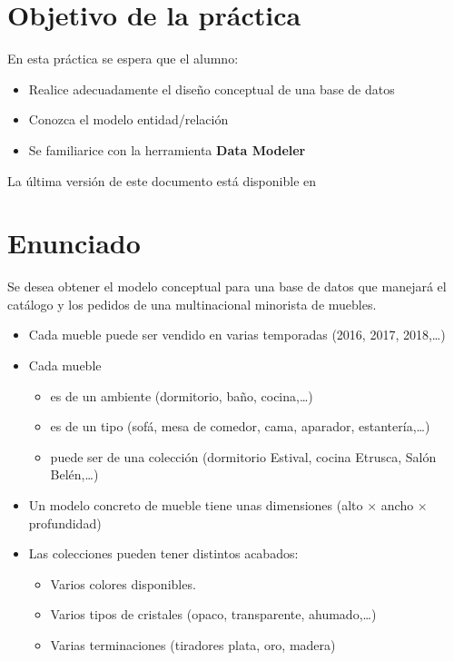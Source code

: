 

\renewcommand{\hmwkTitle}{Diseño de base de datos con \textbf{Data Modeler}}

\renewcommand{\hmwkClass}{Gestión de Base de Datos}




\primerapagina


\section{Objetivo de la práctica} En esta práctica se espera que el alumno:
\begin{itemize}
\item Realice adecuadamente el diseño conceptual de una base de datos
\item Conozca el modelo entidad/relación
\item Se familiarice con la herramienta \textbf{Data Modeler}
  
\end{itemize}

La última versión de este documento está disponible en 


\section{Enunciado}

Se desea obtener el modelo conceptual para una base de datos que manejará el catálogo y los pedidos de una multinacional minorista de muebles.
\begin{itemize}
\item Cada mueble puede ser vendido en varias temporadas (2016, 2017, 2018,…)
\item Cada mueble
  \begin{itemize}
  \item es de un ambiente (dormitorio, baño, cocina,…)
    
  \item es de un tipo (sofá, mesa de comedor, cama, aparador, estantería,…)
  \item    puede ser de una colección (dormitorio Estival, cocina Etrusca, Salón Belén,…)
  \end{itemize}

\item Un modelo concreto de mueble tiene unas dimensiones (alto $\times$ ancho $\times$ profundidad)
\item Las colecciones pueden tener distintos acabados:
  \begin{itemize}
  \item Varios colores disponibles.
  \item Varios tipos de cristales (opaco, transparente, ahumado,…)
  \item Varias terminaciones (tiradores plata, oro, madera)
  \end{itemize}
\end{itemize}



